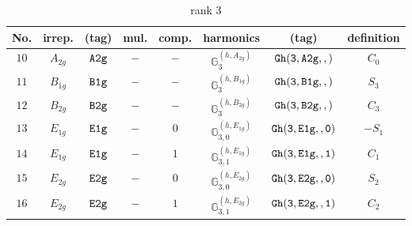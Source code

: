 \documentclass[fleqn,8pt]{jsarticle}
\begin{document}
\begin{table}[ht!]
\begin{center}
\caption{rank 3}
\renewcommand{\arraystretch}{1.3}
\begin{tabular}{cccccccc} \hline \hline
No. & irrep. & (tag) & mul. & comp. & harmonics & (tag) & definition \\ \hline
$ 10 $ & $ A_{2g} $ & $ {\tt A2g} $ & $ - $ & $ - $ & $ \mathbb{G}_{3}^{(h,A_{2g})} $ & $ {\tt Gh(3,A2g,,)} $ & $ C_{0} $ \\
$ 11 $ & $ B_{1g} $ & $ {\tt B1g} $ & $ - $ & $ - $ & $ \mathbb{G}_{3}^{(h,B_{1g})} $ & $ {\tt Gh(3,B1g,,)} $ & $ S_{3} $ \\
$ 12 $ & $ B_{2g} $ & $ {\tt B2g} $ & $ - $ & $ - $ & $ \mathbb{G}_{3}^{(h,B_{2g})} $ & $ {\tt Gh(3,B2g,,)} $ & $ C_{3} $ \\
$ 13 $ & $ E_{1g} $ & $ {\tt E1g} $ & $ - $ & $ 0 $ & $ \mathbb{G}_{3,0}^{(h,E_{1g})} $ & $ {\tt Gh(3,E1g,,0)} $ & $ - S_{1} $ \\
$ 14 $ & $ E_{1g} $ & $ {\tt E1g} $ & $ - $ & $ 1 $ & $ \mathbb{G}_{3,1}^{(h,E_{1g})} $ & $ {\tt Gh(3,E1g,,1)} $ & $ C_{1} $ \\
$ 15 $ & $ E_{2g} $ & $ {\tt E2g} $ & $ - $ & $ 0 $ & $ \mathbb{G}_{3,0}^{(h,E_{2g})} $ & $ {\tt Gh(3,E2g,,0)} $ & $ S_{2} $ \\
$ 16 $ & $ E_{2g} $ & $ {\tt E2g} $ & $ - $ & $ 1 $ & $ \mathbb{G}_{3,1}^{(h,E_{2g})} $ & $ {\tt Gh(3,E2g,,1)} $ & $ C_{2} $ \\
 \hline \hline
\end{tabular}
\end{center}
\end{table}
\end{document}
